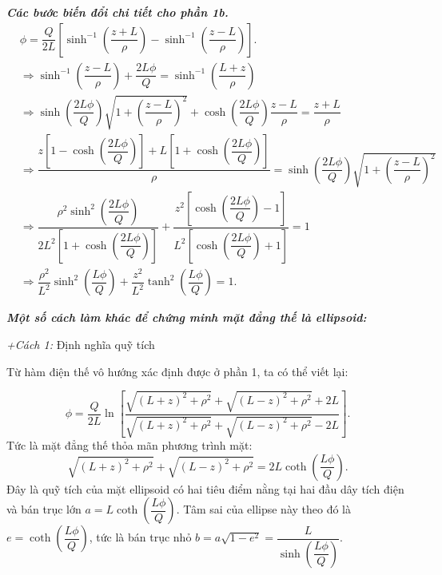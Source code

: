 \textbf{ \textit{Các bước biến đổi chi tiết cho phần 1b.}}
    \begin{align*}
        & \phi = \dfrac{Q}{2L} \left[ \sinh^{-1}\left(\dfrac{z+L}{\rho}\right)-\sinh^{-1}\left(\dfrac{z-L}{\rho}\right) \right]. \\
        & \Rightarrow \sinh^{-1}\left(\dfrac{z-L}{\rho}\right) + \dfrac{2L\phi}{Q}
        = \sinh^{-1}\left(\dfrac{L+z}{\rho}\right) \\
        & \Rightarrow \sinh\left(\dfrac{2L\phi}{Q}\right)\sqrt{1+\left(\dfrac{z-L}{\rho}\right)^2}+\cosh\left(\dfrac{2L\phi}{Q}\right)\dfrac{z-L}{\rho} = \dfrac{z+L}{\rho} \\
        & \Rightarrow \dfrac{z\left[1-\cosh\left(\dfrac{2L\phi}{Q}\right)\right]+L\left[1+\cosh\left(\dfrac{2L\phi}{Q}\right)\right]}{\rho} = \sinh\left(\dfrac{2L\phi}{Q}\right)\sqrt{1+\left(\dfrac{z-L}{\rho}\right)^2}  \\
        & \Rightarrow \dfrac{\rho^2\sinh^2\left(\dfrac{2L\phi}{Q}\right)}{2L^2\left[1+\cosh\left(\dfrac{2L\phi}{Q}\right)\right]}+\dfrac{z^2\left[\cosh\left(\dfrac{2L\phi}{Q}\right)-1\right]}{L^2\left[\cosh\left(\dfrac{2L\phi}{Q}\right)+1\right]} = 1 \\
        & \Rightarrow \dfrac{\rho^2}{L^2}\sinh^2\left(\dfrac{L\phi}{Q}\right)+\dfrac{z^2}{L^2}\tanh^2\left(\dfrac{L\phi}{Q}\right) = 1.
    \end{align*}

\textbf{ \textit{Một số cách làm khác để chứng minh mặt đẳng thế là ellipsoid:}}

\textit{+Cách 1:} Định nghĩa quỹ tích

Từ hàm điện thế vô hướng xác định được ở phần 1, ta có thể viết lại:

\begin{equation} \label{eq4_ellipsoid_conductor}
    \phi = \dfrac{Q}{2L} \ln \left[ \dfrac{\sqrt{(L+z)^2 +\rho^2} + \sqrt{(L-z)^2 + \rho^2} + 2L}{\sqrt{(L+z)^2 + \rho^2} + \sqrt{(L-z)^2 + \rho^2} - 2L} \right].
\end{equation}
Tức là mặt đẳng thế thỏa mãn phương trình mặt:
\begin{equation} \label{eq5_ellipsoid_conductor}
    \sqrt{(L+z)^2 + \rho^2} + \sqrt{(L-z)^2 + \rho^2} = 2 L \coth \left( \dfrac{L \phi}{Q} \right).
\end{equation}
Đây là quỹ tích của mặt ellipsoid có hai tiêu điểm nằng tại hai đầu dây tích điện và bán trục lớn $a= L \coth \left( \dfrac{L \phi}{Q} \right)$. Tâm sai của ellipse này theo đó là $e=\coth \left( \dfrac{L \phi}{Q} \right)$, tức là bán trục nhỏ $b= a \sqrt{1-e^2} = \dfrac{L}{ \sinh \left( \dfrac{L \phi}{Q} \right)}$.


